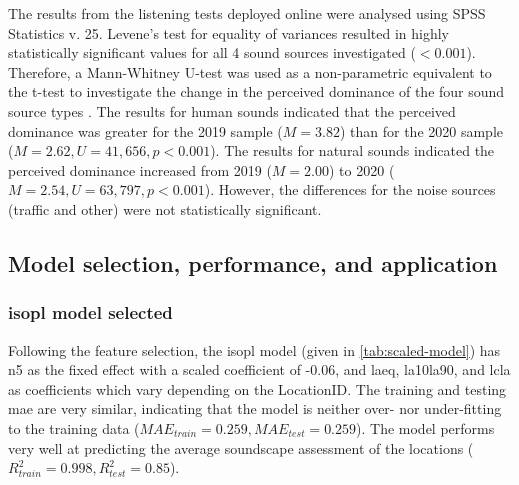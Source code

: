    The results from the listening tests deployed online were analysed using SPSS Statistics v. 25. Levene's test for equality of variances resulted in highly statistically significant values for all 4 sound sources investigated ($<0.001$). Therefore, a Mann-Whitney U-test was used as a non-parametric equivalent to the t-test to investigate the change in the perceived dominance of the four sound source types \citep{McKnight2010Mann}. The results for human sounds indicated that the perceived dominance was greater for the 2019 sample ($M=3.82$) than for the 2020 sample ($M=2.62, U=41,656, p<0.001$). The results for natural sounds indicated the perceived dominance increased from 2019 ($M=2.00$) to 2020 ($M=2.54, U=63,797, p<0.001$). However, the differences for the noise sources (traffic and other) were not statistically significant.

   \begin{figure}[h]
     \caption{\label{tab:source-dominance-stats}}
   \end{figure}

 \subsection{Model selection, performance, and application}

   \subsubsection{\gls{isopl} model selected}

   Following the feature selection, the \gls{isopl} model (given in \cref{tab:scaled-model}) has \gls{n5} as the fixed effect with a scaled coefficient of -0.06, and \gls{laeq}, \gls{la10la90}, and \gls{lcla} as coefficients which vary depending on the LocationID. The training and testing \gls{mae} are very similar, indicating that the model is neither over- nor under-fitting to the training data ($MAE_{train}=0.259, MAE_{test}=0.259$). The model performs very well at predicting the average soundscape assessment of the locations ($R^2_{train}=0.998, R^2_{test}=0.85$).


